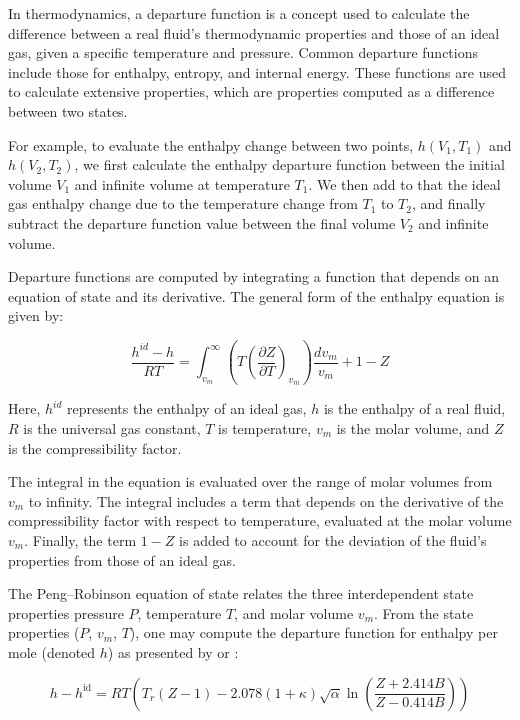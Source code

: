 \documentclass[../Article_Model_Parameters.tex]{subfiles}
\begin{document}
	In thermodynamics, a departure function is a concept used to calculate the difference between a real fluid's thermodynamic properties and those of an ideal gas, given a specific temperature and pressure. Common departure functions include those for enthalpy, entropy, and internal energy. These functions are used to calculate extensive properties, which are properties computed as a difference between two states.
	
	For example, to evaluate the enthalpy change between two points, $h(V_1,T_1)$ and $h(V_2,T_2)$, we first calculate the enthalpy departure function between the initial volume $V_1$ and infinite volume at temperature $T_1$. We then add to that the ideal gas enthalpy change due to the temperature change from $T_1$ to $T_2$, and finally subtract the departure function value between the final volume $V_2$ and infinite volume.
	
	Departure functions are computed by integrating a function that depends on an equation of state and its derivative. The general form of the enthalpy equation is given by:
	
	{\footnotesize
		\begin{equation}
			\frac{h^{id}-h}{RT} =\int_{v_m}^{\infty }\left(T\left({\frac{\partial Z}{\partial T}}\right)_{v_m}\right){\frac{dv_m}{v_m}} + 1-Z
		\end{equation}
	}
	
	Here, $h^{id}$ represents the enthalpy of an ideal gas, $h$ is the enthalpy of a real fluid, $R$ is the universal gas constant, $T$ is temperature, $v_m$ is the molar volume, and $Z$ is the compressibility factor.
	
	The integral in the equation is evaluated over the range of molar volumes from $v_m$ to infinity. The integral includes a term that depends on the derivative of the compressibility factor with respect to temperature, evaluated at the molar volume $v_m$. Finally, the term $1-Z$ is added to account for the deviation of the fluid's properties from those of an ideal gas.

	The Peng–Robinson equation of state relates the three interdependent state properties pressure $P$, temperature $T$, and molar volume $v_m$. From the state properties ($P$, $v_m$, $T$), one may compute the departure function for enthalpy per mole (denoted $h$) as presented by \citet{Gmehling2019} or \citet{Elliott2011}:
	
	{\footnotesize
		\begin{equation}
			h-h^{\mathrm {id} }=RT\left(T_{r}(Z-1)-2.078(1+\kappa ){\sqrt {\alpha }}\ln \left({\frac {Z+2.414B}{Z-0.414B}}\right)\right)
		\end{equation}
	}
	
	
\end{document}
